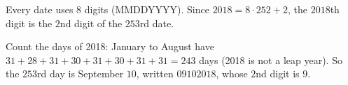 Every date uses $8$ digits (MMDDYYYY). Since $2018=8\cdot252+2$, the $2018$th digit is the $2$nd digit of the $253$rd date.

Count the days of 2018: January to August have $31+28+31+30+31+30+31+31=243$ days (2018 is not a leap year). So the $253$rd day is September $10$, written $09102018$, whose $2$nd digit is $\boxed{9}$.
